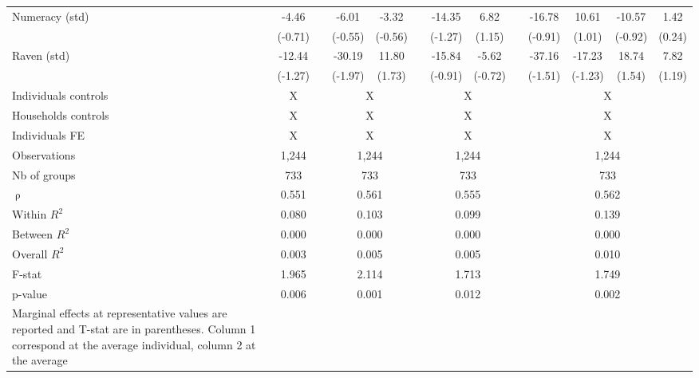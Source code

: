 \begin{table}[!h]
{\begin{tabular}{lcccccccccccc}
    Numeracy (std) & -4.46 &   & -6.01 & -3.32 &   & -14.35 & 6.82 &   & -16.78 & 10.61 & -10.57 & 1.42 \\
      & (-0.71) &   & (-0.55) & (-0.56) &   & (-1.27) & (1.15) &   & (-0.91) & (1.01) & (-0.92) & (0.24) \\
    Raven (std) & -12.44 &   & -30.19 & 11.80 &   & -15.84 & -5.62 &   & -37.16 & -17.23 & 18.74 & 7.82 \\
      & (-1.27) &   & (-1.97) & (1.73) &   & (-0.91) & (-0.72) &   & (-1.51) & (-1.23) & (1.54) & (1.19) \\
\cmidrule{1-2}\cmidrule{4-5}\cmidrule{7-8}\cmidrule{10-13}  
	Individuals controls & X     &       & \multicolumn{2}{c}{X} &       & \multicolumn{2}{c}{X} &       & \multicolumn{4}{c}{X} \\
    Households controls & X     &       & \multicolumn{2}{c}{X} &       & \multicolumn{2}{c}{X} &       & \multicolumn{4}{c}{X} \\
    Individuals FE & X     &       & \multicolumn{2}{c}{X} &       & \multicolumn{2}{c}{X} &       & \multicolumn{4}{c}{X} \\
    \midrule
    Observations & 1,244  &       & \multicolumn{2}{c}{1,244} &       & \multicolumn{2}{c}{1,244} &       & \multicolumn{4}{c}{1,244} \\
    Nb of groups & 733   &       & \multicolumn{2}{c}{733} &       & \multicolumn{2}{c}{733} &       & \multicolumn{4}{c}{733} \\
    $\uprho$ & 0.551 &       & \multicolumn{2}{c}{0.561} &       & \multicolumn{2}{c}{0.555} &       & \multicolumn{4}{c}{0.562} \\
    Within $R^2$ & 0.080 &       & \multicolumn{2}{c}{0.103} &       & \multicolumn{2}{c}{0.099} &       & \multicolumn{4}{c}{0.139} \\
    Between $R^2$ & 0.000 &       & \multicolumn{2}{c}{0.000} &       & \multicolumn{2}{c}{0.000} &       & \multicolumn{4}{c}{0.000} \\
    Overall $R^2$ & 0.003 &       & \multicolumn{2}{c}{0.005} &       & \multicolumn{2}{c}{0.005} &       & \multicolumn{4}{c}{0.010} \\
    F-stat & 1.965 &       & \multicolumn{2}{c}{2.114} &       & \multicolumn{2}{c}{1.713} &       & \multicolumn{4}{c}{1.749} \\
    p-value & 0.006 &       & \multicolumn{2}{c}{0.001} &       & \multicolumn{2}{c}{0.012} &       & \multicolumn{4}{c}{0.002} \\
    \bottomrule
	\Tablenote{13}{
	Marginal effects at representative values are reported and T-stat are in parentheses. Column 1 correspond at the average individual, column 2 at the average \\ 
}
\end{tabular}}
\end{table}

